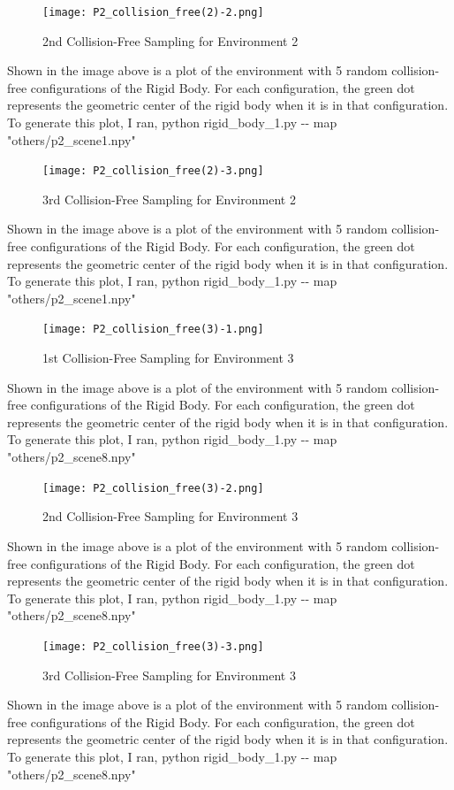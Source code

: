 \documentclass{article}
\begin{document}
\newpage 
\begin{figure}[h!]
	\texttt{[image: P2\_collision\_free(2)-2.png]}
	\centering
	\caption{2nd Collision-Free Sampling for Environment 2}
	\label{P2_collision_free(2)-2.png}
\end{figure}
Shown in the image above is a plot of the environment with 5 random collision-free configurations of the Rigid Body. For each configuration, the green dot represents the geometric center of the rigid body when it is in that configuration. To generate this plot, I ran, python rigid\_body\_1.py -\-- map "others/p2\_scene1.npy"

\newpage 
\begin{figure}[h!]
	\texttt{[image: P2\_collision\_free(2)-3.png]}
	\centering
	\caption{3rd Collision-Free Sampling for Environment 2}
	\label{P2_collision_free(2)-3.png}
\end{figure}
Shown in the image above is a plot of the environment with 5 random collision-free configurations of the Rigid Body. For each configuration, the green dot represents the geometric center of the rigid body when it is in that configuration. To generate this plot, I ran, python rigid\_body\_1.py -\-- map "others/p2\_scene1.npy"

\newpage 
\begin{figure}[h!]
	\texttt{[image: P2\_collision\_free(3)-1.png]}
	\centering
	\caption{1st Collision-Free Sampling for Environment 3}
	\label{P2_collision_free(3)-1.png}
\end{figure}
Shown in the image above is a plot of the environment with 5 random collision-free configurations of the Rigid Body. For each configuration, the green dot represents the geometric center of the rigid body when it is in that configuration. To generate this plot, I ran, python rigid\_body\_1.py -\-- map "others/p2\_scene8.npy"

\newpage 
\begin{figure}[h!]
	\texttt{[image: P2\_collision\_free(3)-2.png]}
	\centering
	\caption{2nd Collision-Free Sampling for Environment 3}
	\label{P2_collision_free(3)-2.png}
\end{figure}
Shown in the image above is a plot of the environment with 5 random collision-free configurations of the Rigid Body. For each configuration, the green dot represents the geometric center of the rigid body when it is in that configuration. To generate this plot, I ran, python rigid\_body\_1.py -\-- map "others/p2\_scene8.npy"

\newpage 
\begin{figure}[h!]
	\texttt{[image: P2\_collision\_free(3)-3.png]}
	\centering
	\caption{3rd Collision-Free Sampling for Environment 3}
	\label{P2_collision_free(3)-3.png}
\end{figure}
Shown in the image above is a plot of the environment with 5 random collision-free configurations of the Rigid Body. For each configuration, the green dot represents the geometric center of the rigid body when it is in that configuration. To generate this plot, I ran, python rigid\_body\_1.py -\-- map "others/p2\_scene8.npy"
\end{document}
